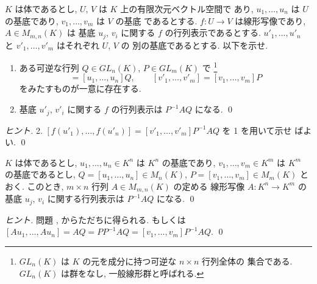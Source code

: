 \documentclass[12pt,twoside]{jarticle}
\begin{document}
\begin{question}[基底の変換]
  \label{q:P^{-1}AQ}
  $K$ は体であるとし, $U$, $V$ は $K$ 上の有限次元ベクトル空間で
  あり, $u_1,\ldots,u_n$ は $U$ の基底であり, $v_1,\ldots,v_m$ は $V$ の基底
  であるとする.  $f:U\to V$ は線形写像であり, $A\in M_{m,n}(K)$ は
  基底 $u_j$, $v_i$ に関する $f$ の行列表示であるとする.
  $u'_1,\ldots,u'_n$ と $v'_1,\ldots,v'_m$ はそれぞれ $U$, $V$ の
  別の基底であるとする.  以下を示せ.
  \begin{enumerate}
  \item ある可逆な行列 $Q\in GL_n(K)$, $P\in GL_m(K)$ で%
    \footnote{$GL_n(K)$ は $K$ の元を成分に持つ可逆な $n\times n$ 行列全体の
      集合である.  $GL_n(K)$ は群をなし, 一般線形群と呼ばれる.}
    \begin{equation*}
      [u'_1,\ldots,u'_n]=[u_1,\ldots,u_n]Q,
      \qquad
      [v'_1,\ldots,v'_m] = [v_1,\ldots,v_m]P
    \end{equation*}
    をみたすものが一意に存在する.
  \item 基底 $u'_j$, $v'_i$ に関する $f$ の行列表示は $P^{-1}AQ$ になる.
    \qed
  \end{enumerate}
\end{question}

\begin{proof}[ヒント]
  2. $[f(u'_1),\ldots,f(u'_n)]=[v'_1,\ldots,v'_m]P^{-1}AQ$ を 1 を用いて示せ
  ばよい. \qed
\end{proof}


\begin{question}
  $K$ は体であるとし, 
  $u_1,\ldots,u_n\in K^n$ は $K^n$ の基底であり, 
  $v_1,\ldots,v_m\in K^m$ は $K^m$ の基底であるとし,
  $Q=[u_1,\ldots,u_n]\in M_n(K)$, $P=[v_1,\ldots,v_m]\in M_m(K)$ とおく.
  このとき, $m\times n$ 行列 $A\in M_{m,n}(K)$ の定める
  線形写像 $A:K^n\to K^m$ の
  基底 $u_j$, $v_i$ に関する行列表示は $P^{-1}AQ$ になる.
  \qed
\end{question}

\begin{proof}[ヒント]
  問題 ,  からただちに得られる.
  もしくは $[Au_1,\ldots,Au_n]=AQ=PP^{-1}AQ=[v_1,\ldots,v_m]P^{-1}AQ$. 
  \qed
\end{proof}

\end{document}
